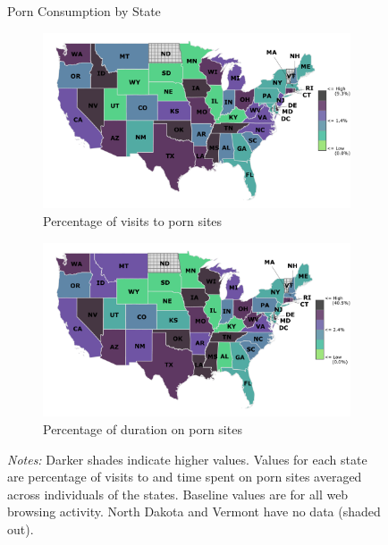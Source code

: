 \documentclass[12pt, letterpaper]{article}
\begin{document}
\begin{figure}[t]
	\caption{Porn Consumption by State}
	\label{fig:map_porn}
	\centering
	\begin{subfigure}[t]{0.8\textwidth}
		\centering
		\includegraphics[width=\textwidth]{../figs/map_visits.pdf}
		\caption{Percentage of visits to porn sites}
	\end{subfigure}
	\begin{subfigure}[t]{0.8\textwidth}
		\centering
		\includegraphics[width=\textwidth]{../figs/map_duration.pdf}
		\caption{Percentage of duration on porn sites}
	\end{subfigure}
	\caption*{\footnotesize \emph{Notes:} 
		Darker shades indicate higher values.
		Values for each state are percentage of visits to and time spent on porn sites averaged across individuals of the states.
		Baseline values are for all web browsing activity.
		North Dakota and Vermont have no data (shaded out).}
\end{figure}

\FloatBarrier
\end{document}
